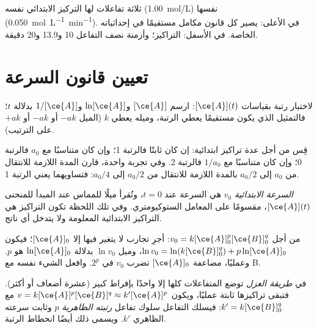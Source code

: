 \begin{omfigure}
{\small ثلاثة تفاعلات لها التركيز الابتدائي نفسه
(\qty{1.00}{mol/L})  نفسها
(\qty{0.050}{mol.L^{-1}.min^{-1}}). في الأعلى: يصير كل قانون مكامل
مستقيمًا في إحداثياته الخاصة. في الأسفل: التراكيز؛ وأزمنة
نصف التفاعل 10 و13.9 و20 دقيقة.}
\end{omfigure}

\section{تعيين قانون السرعة}

\begin{method}\label{met:b1:rate-laws:integral}
لاختبار رتبة بقياسات $[\ce{A}](t)$: ارسم $[\ce{A}]$
و$\ln[\ce{A}]$ و$1/[\ce{A}]$ بدلالة $t$؛ فالتمثيل الذي يكون
مستقيمًا يعطي الرتبة، وميله يعطي $k$ (الميل $-ak$ أو $-ak$ أو $+ak$
على الترتيب).
\end{method}

\begin{method}\label{met:b1:rate-laws:half-life}
قِس  من أجل عدة تراكيز ابتدائية: إن كان ثابتًا
فالرتبة 1؛ وإن كان متناسبًا مع $a_0$ فالرتبة 0؛ وإن كان متناسبًا مع $1/a_0$ فالرتبة
2. وفي تجربة واحدة، قارن المدة اللازمة للانتقال من $a_0$ إلى $a_0/2$
بالمدة اللازمة للانتقال من $a_0/2$ إلى $a_0/4$: فتساويهما يعني الرتبة 1.
\end{method}

\begin{definition}\label{def:b1:rate-laws:initial-rate}
\emph{السرعة الابتدائية} $v_0$ هي السرعة عند $t = 0$،
وتُقرأ ميلًا للمماس عند المبدأ للمنحنى $[\ce{A}](t)$،
مقسومًا على المعامل الستوكيومتري. وفي تلك اللحظة تكون
التراكيز هي التراكيز الابتدائية المعلومة ولا يتدخل أي ناتج.
\end{definition}

\begin{method}\label{met:b1:rate-laws:initial-rates}
من أجل $v_0 = k[\ce{A}]_0^p[\ce{B}]_0^q$: أجرِ تجارب لا يتغير فيها
إلا $[\ce{A}]_0$؛ فيكون $\ln v_0 = \ln(k[\ce{B}]_0^q) + p\ln[\ce{A}]_0$،
وميل $\ln v_0$ بدلالة $\ln[\ce{A}]_0$ هو $p$. وعمليًا،
مضاعفة $[\ce{A}]_0$ تضرب $v_0$ في $2^p$. وافعل الشيء نفسه مع B.
\end{method}

\begin{definition}\label{def:b1:rate-laws:apparent-order}
في \emph{طريقة العزل} توضع المتفاعلات كلها إلا
واحدًا بإفراط كبير (عشرة أضعاف أو أكثر). فتبقى تراكيزها
ثابتة عمليًا، ويكون $v = k[\ce{A}]^p[\ce{B}]^q \approx k'[\ce{A}]^p$
مع $k' = k[\ce{B}]_0^q$: فيسلك التفاعل سلوك تفاعل
\emph{رتبته الظاهرية} $p$ وثابت سرعته الظاهري
$k'$. ويسمى ذلك أيضًا انحطاط الرتبة.
\end{definition}

